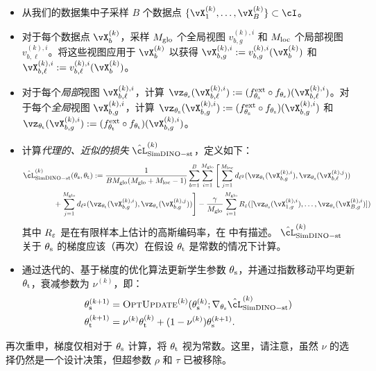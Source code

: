 \documentclass[../../book-main.tex]{subfiles}
\begin{document}
\begin{itemize}
    \item 从我们的数据集中子采样 \(B\) 个数据点 \(\{\vX_{1}^{(k)}, \dots, \vX_{B}^{(k)}\} \subset \cI\)。
    \item 对于每个数据点 \(\vX_{b}^{(k)}\)，采样 \(M_{\mathrm{glo}}\) 个全局视图 \(v_{b, g}^{(k), i}\) 和 \(M_{\mathrm{loc}}\) 个局部视图 \(v_{b, \ell}^{(k), i}\)。将这些视图应用于 \(\vX_{b}^{(k)}\) 以获得 \(\vX_{b, g}^{(k), i} := v_{b, g}^{(k), i}(\vX_{b}^{(k)})\) 和 \(\vX_{b, \ell}^{(k), i} := v_{b, \ell}^{(k), i}(\vX_{b}^{(k)})\)。
    \item 对于每个\textit{局部}视图 \(\vX_{b, \ell}^{(k), i}\)，计算 \(\vz_{\theta_{\student}}(\vX_{b, \ell}^{(k), i}) := (f_{\theta_{\student}}^{\ext} \circ f_{\theta_{\student}})(\vX_{b, \ell}^{(k), i})\)。对于每个\textit{全局}视图 \(\vX_{b, g}^{(k), i}\)，计算 \(\vz_{\theta_{\student}}(\vX_{b, g}^{(k), i}) := (f_{\theta_{\student}}^{\ext} \circ f_{\theta_{\student}})(\vX_{b, g}^{(k), i})\) 和 \(\vz_{\theta_{\teacher}}(\vX_{b, g}^{(k), i}) := (f_{\theta_{\teacher}}^{\ext} \circ f_{\theta_{\teacher}})(\vX_{b, g}^{(k), i})\)。
    \item 计算\textit{代理的、近似的损失} \(\hat{\cL}_{\simdino-\student\teacher}^{(k)}\)，定义如下：
    \begin{align}\label{eq:simdino_loss_teacherstudent_empirical}
        &\hat{\cL}_{\simdino{}-\student\teacher}^{(k)}(\theta_{\student}, \theta_{\teacher}) :=
        \frac{1}{BM_{\glo}(M_{\glo} + M_{\loc} - 1)}\sum_{b = 1}^{B}\sum_{i = 1}^{M_{\glo}}\Bigg[\sum_{j = 1}^{M_{\loc}}d_{\ell^{2}}(\vz_{\theta_{\teacher}}(\vX_{b, g}^{(k), i}), \vz_{\theta_{\student}}(\vX_{b, \ell}^{(k), j})) \\ 
        &\qquad \qquad + \sum_{j = 1}^{M_{\glo}}d_{\ell^{2}}(\vz_{\theta_{\teacher}}(\vX_{b, g}^{(k), i}), \vz_{\theta_{\student}}(\vX_{b, g}^{(k), j}))\Bigg] - \frac{\gamma}{M_{\glo}}\sum_{i = 1}^{M_{\glo}}R_{\eps}([\vz_{\theta_{\student}}(\vX_{1, g}^{(k), i}), \dots, \vz_{\theta_{\student}}(\vX_{B, g}^{(k), i})])\nonumber
    \end{align}
    其中 \(R_{\varepsilon}\) 是在有限样本上估计的高斯编码率，在  中有描述。 \(\hat{\cL}_{\simdino-\student\teacher}^{(k)}\) 关于 \(\theta_{\mathrm{s}}\) 的梯度应该（再次）在假设 \(\theta_{\mathrm{t}}\) 是常数的情况下计算。
    \item 通过迭代的、基于梯度的优化算法更新学生参数 \(\theta_{\mathrm{s}}\)，并通过指数移动平均更新 \(\theta_{\mathrm{t}}\)，衰减参数为 \(\nu^{(k)}\)，即：
    \begin{align}
        \theta_{\student}^{(k + 1)}
        &= \textsc{OptUpdate}^{(k)}(\theta_{\student}^{(k)}; \nabla_{\theta_{\student}}\hat{\cL}_{\simdino-\student\teacher}^{(k)}) \\
        \theta_{\teacher}^{(k + 1)}
        &= \nu^{(k)}\theta_{\teacher}^{(k)} + (1 - \nu^{(k)})\theta_{\student}^{(k + 1)}.
    \end{align}
\end{itemize}
再次重申，梯度仅相对于 \(\theta_{\mathrm{s}}\) 计算，将 \(\theta_{\mathrm{t}}\) 视为常数。这里，请注意，虽然 \(\nu\) 的选择仍然是一个设计决策，但超参数 \(\rho\) 和 \(\tau\) 已被移除。
\end{document}
